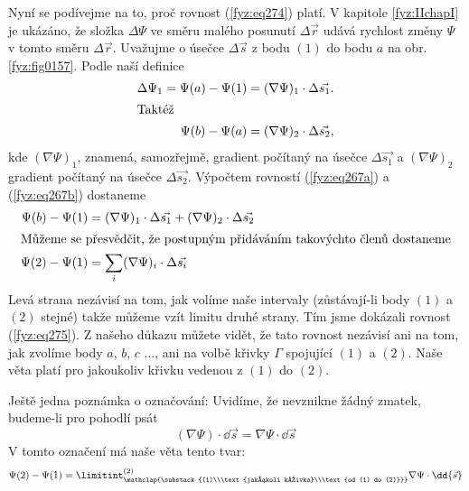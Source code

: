       Nyní se podívejme na to, proč rovnost (\ref{fyz:eq274}) platí. V kapitole   
      \ref{fyz:IIchapI} je ukázáno, že složka \(\Delta\Psi\) ve směru malého posunutí 
      \(\Delta\vec{r}\) udává rychlost změny \(\Psi\) v tomto směru \(\Delta\vec{r}\). Uvažujme o 
      úsečce \(\Delta\vec{s}\) z bodu \((1)\) do bodu \(a\) na obr. \ref{fyz:fig0157}. Podle 
      naší definice  
      \begin{align}
        \Delta\Psi_1 = \Psi(a) - \Psi(1) 
          &= (\nabla\Psi)_1\cdot\Delta\vec{s_1}.         \label{fyz:eq267a}  \\
        \shortintertext{Taktéž}
        \Psi(b) - \Psi(a)
          &= (\nabla\Psi)_2\cdot\Delta\vec{s_2},         \label{fyz:eq267b}
      \end{align}
      kde \((\nabla\Psi)_1\), znamená, samozřejmě, gradient počítaný na úsečce \(\Delta\vec{s_1}\) a 
      \((\nabla\Psi)_2\) gradient počítaný na úsečce \(\Delta\vec{s_2}\). Výpočtem rovností 
      (\ref{fyz:eq267a}) a (\ref{fyz:eq267b}) dostaneme
      \begin{align}
        \Psi(b) - \Psi(1)              &= 
          (\nabla\Psi)_1\cdot\Delta\vec{s_1} + 
          (\nabla\Psi)_2\cdot\Delta\vec{s_2}               \label{fyz:eq268a} \\
        \shortintertext{Můžeme se přesvědčit, že postupným přidáváním takovýchto členů dostaneme}
        \Psi(2) - \Psi(1)              &= 
          \sum_i(\nabla\Psi)_i\cdot\Delta\vec{s_i}          \label{fyz:eq268b}
      \end{align}
      Levá strana nezávisí na tom, jak volíme naše intervaly (zů\-stá\-va\-jí-li body \((1)\) a 
      \((2)\) stejné) takže můžeme vzít limitu druhé strany. Tím jsme dokázali rovnost 
      (\ref{fyz:eq275}). Z našeho důkazu můžete vidět, že tato rovnost nezávisí ani na 
      tom, jak zvolíme body \(a\), \(b\), \(c\) ..., ani na volbě křivky \(\Gamma\) spojující \((1)\) 
      a \((2)\). Naše věta platí pro jakoukoliv křivku vedenou z \((1)\) do \((2)\).
      
      Ještě jedna poznámka o označování: Uvidíme, že nevznikne žádný zmatek, budeme-li pro pohodlí
      psát
      \begin{equation}\label{fyz:eq269}
        (\nabla\Psi)\cdot\dd{\vec{s}} = \nabla\Psi\cdot\dd{\vec{s}}
      \end{equation}     
      V tomto označení má naše věta tento tvar:
      \begin{equation}\label{fyz:eq273}
        \Psi(2)-\Psi(1) =  
          \limitint_{\mathclap{\substack{(1)\\\text{jakákoli křivka}\\\text{od (1) do 
          (2)}}}}^{(2)}
            \nabla\Psi\cdot\dd{\vec{s}}
      \end{equation}
  
